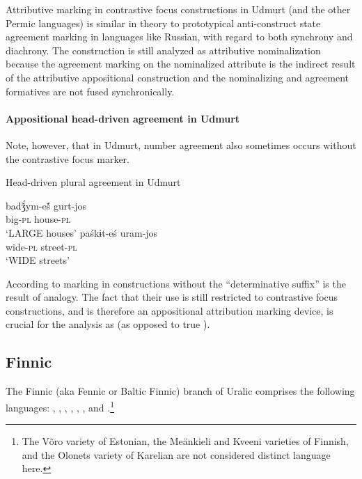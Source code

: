 Attributive marking in contrastive focus constructions in Udmurt (and the other Permic languages) is similar in theory to prototypical anti\hyp{}construct state agreement marking in languages like Russian, with regard to both synchrony and diachrony. The construction is still analyzed as attributive nominalization because the agreement marking on the nominalized attribute is the indirect result of the attributive appositional construction and the nominalizing and agreement formatives are not fused synchronically.

\paragraph*{Appositional head\hyp{}driven agreement in Udmurt}
Note, however, that in Udmurt, number agreement also sometimes occurs without the contrastive focus marker.
\begin{exe}
\ex \rm{Head\hyp{}driven plural agreement in Udmurt}
\begin{xlist}
\ex 
\gll	badǯ́ym-eš́ gurt-jos\\
	big-\textsc{pl} house-\textsc{pl}\\
\glt	‘LARGE houses’ \citep[40]{winkler2001}
\ex 
\gll	paśkɨt-eś uram-jos\\
	wide-\textsc{pl} street-\textsc{pl}\\
\glt	‘WIDE streets’ \citep[63]{csucs1990}
\end{xlist}
\end{exe}
According to \citet[63]{csucs1990}  marking in constructions without the “determinative suffix” is the result of analogy. The fact that their use is still restricted to contrastive focus constructions, and is therefore an appositional attribution marking device, is crucial for the analysis as  (as opposed to true ).

\subsection{Finnic}
The Finnic (aka Fennic or Baltic Finnic) branch of Uralic comprises the following languages: , , , , , ,  and .\footnote{The Võro variety of Estonian, the Meänkieli and Kveeni varieties of Finnish, and the Olonets variety of Karelian are not considered distinct language here.}

